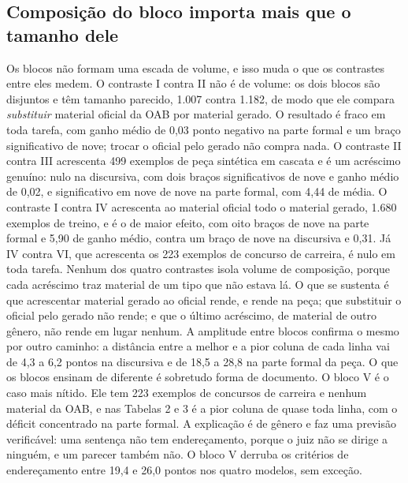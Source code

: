 \documentclass{IOS-Book-Article}
\begin{document}
\subsection{Composição do bloco importa mais que o tamanho dele}
Os blocos não formam uma escada de volume, e isso muda o que os contrastes entre eles medem. O contraste I contra II não é de volume: os dois blocos são disjuntos e têm tamanho parecido, 1.007 contra 1.182, de modo que ele compara \emph{substituir} material oficial da OAB por material gerado. O resultado é fraco em toda tarefa, com ganho médio de 0,03 ponto negativo na parte formal e um braço significativo de nove; trocar o oficial pelo gerado não compra nada. O contraste II contra III acrescenta 499 exemplos de peça sintética em cascata e é um acréscimo genuíno: nulo na discursiva, com dois braços significativos de nove e ganho médio de 0,02, e significativo em nove de nove na parte formal, com 4,44 de média. O contraste I contra IV acrescenta ao material oficial todo o material gerado, 1.680 exemplos de treino, e é o de maior efeito, com oito braços de nove na parte formal e 5,90 de ganho médio, contra um braço de nove na discursiva e 0,31. Já IV contra VI, que acrescenta os 223 exemplos de concurso de carreira, é nulo em toda tarefa.
Nenhum dos quatro contrastes isola volume de composição, porque cada acréscimo traz material de um tipo que não estava lá. O que se sustenta é que acrescentar material gerado ao oficial rende, e rende na peça; que substituir o oficial pelo gerado não rende; e que o último acréscimo, de material de outro gênero, não rende em lugar nenhum. A amplitude entre blocos confirma o mesmo por outro caminho: a distância entre a melhor e a pior coluna de cada linha vai de 4,3 a 6,2 pontos na discursiva e de 18,5 a 28,8 na parte formal da peça. O que os blocos ensinam de diferente é sobretudo forma de documento.
O bloco V é o caso mais nítido. Ele tem 223 exemplos de concursos de carreira e nenhum material da OAB, e nas Tabelas 2 e 3 é a pior coluna de quase toda linha, com o déficit concentrado na parte formal. A explicação é de gênero e faz uma previsão verificável: uma sentença não tem endereçamento, porque o juiz não se dirige a ninguém, e um parecer também não. O bloco V derruba os critérios de endereçamento entre 19,4 e 26,0 pontos nos quatro modelos, sem exceção.
\end{document}
